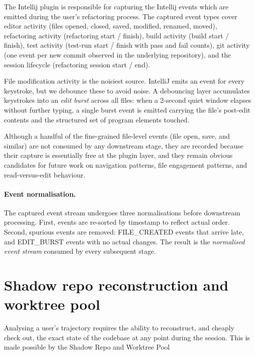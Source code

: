 The Intellij plugin is responsible for capturing the Intellij events which are emitted during the user's refactoring process. The captured event types cover editor activity (files opened, closed, saved, modified, renamed, moved), refactoring activity (refactoring start / finish), build activity (build start / finish), test activity (test-run start / finish with pass and fail counts), git activity (one event per new commit observed in the underlying repository), and the session lifecycle (refactoring session start / end).

File modification activity is the noisiest source. IntelliJ emits an event for every keystroke, but we debounce these to avoid noise. A debouncing layer accumulates keystrokes into an \emph{edit burst} across all files: when a 2-second quiet window elapses without further typing, a single burst event is emitted carrying the file's post-edit contents and the structured set of program elements touched.

Although a handful of the fine-grained file-level events (file open, save, and similar) are not consumed by any downstream stage, they are recorded because their capture is essentially free at the plugin layer, and they remain obvious candidates for future work on navigation patterns, file engagement patterns, and read-versus-edit behaviour.

\paragraph{Event normalisation.}
The captured event stream undergoes three normalisations before downstream processing. First, events are re-sorted by timestamp to reflect actual order. Second, spurious events are removed: FILE\_CREATED events that arrive late, and EDIT\_BURST events with no actual changes. The result is the \emph{normalised event stream} consumed by every subsequent stage.

\section{Shadow repo reconstruction and worktree pool}
\label{sec:arch-shadow}

Analysing a user's trajectory requires the ability to reconstruct, and cheaply check out, the exact state of the codebase at any point during the session. This is made possible by the Shadow Repo and Worktree Pool

